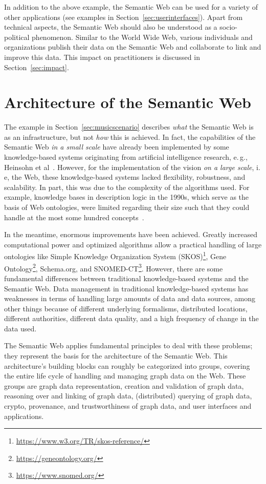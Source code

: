 \documentclass[a4paper,USenglish]{tgdk-v2021}
\newcommand{\myurl}[1]{\footnote{\url{#1}}}
\begin{document}
In addition to the above example, the Semantic Web can be used for a variety of other applications (see examples in Section~\ref{sec:userinterfaces}).
Apart from technical aspects, the Semantic Web should also be understood as a socio-political phenomenon.
Similar to the World Wide Web, various individuals and organizations publish their data on the Semantic Web and collaborate to link and improve this data.
This impact on practitioners is discussed in Section~\ref{sec:impact}.

\section{Architecture of the Semantic Web}
\label{sec:swarchitecture}

The example in Section~\ref{sec:musicscenario} describes \emph{what} the Semantic Web is as an infrastructure, but not \emph{how} this is achieved.
In fact, the capabilities of the Semantic Web \emph{in a small scale} have already been implemented by some knowledge-based systems originating from artificial intelligence research, e.\,g., Heinsohn et al~\cite{DBLP:journals/ai/HeinsohnKNP94}.
However, for the implementation of the vision \emph{on a large scale}, i.\,e, the Web, these knowledge-based systems lacked flexibility, robustness, and scalability.
In part, this was due to the complexity of the algorithms used.
For example, knowledge bases in description logic in the 1990s, which serve as the basis of Web ontologies, were limited regarding their size such that they could handle at the most some hundred concepts~\cite{DBLP:journals/ai/HeinsohnKNP94}.

In the meantime, enormous improvements have been achieved.
Greatly increased computational power and optimized algorithms allow a practical handling of large ontologies like 
Simple Knowledge Organization System (SKOS)\myurl{https://www.w3.org/TR/skos-reference/}, 
Gene Ontology\myurl{https://geneontology.org/}, Schema.org, and SNOMED-CT\myurl{https://www.snomed.org/}.
However, there are some fundamental differences between traditional knowledge-based systems and the Semantic Web.
Data management in traditional knowledge-based systems has weaknesses in terms of handling large amounts of data and data sources, among other things because of 
different underlying formalisms,
distributed locations, 
different authorities,
different data quality, and 
a high frequency of change in the data used.

The Semantic Web applies fundamental principles to deal with these problems; they represent the basis for the architecture of the Semantic Web.
This architecture's building blocks can roughly be categorized into groups, covering the entire life cycle of handling and managing graph data on the Web.
These groups are
graph data representation,
creation and validation of graph data,
reasoning over and linking of graph data,
(distributed) querying of graph data, 
crypto, provenance, and trustworthiness of graph data, and
user interfaces and applications.
\end{document}
